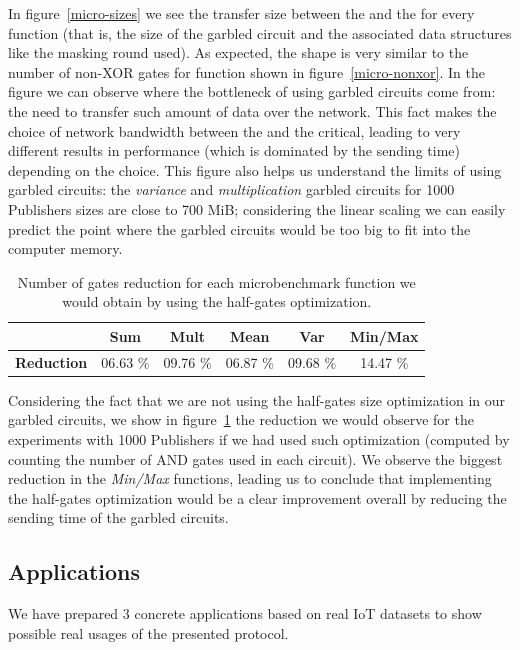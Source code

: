 In figure~\ref{micro-sizes} we see the transfer size between the \broker and
the \garbler for every function (that is, the size of the garbled circuit and
the associated data structures like the masking round used).  As expected, the
shape is very similar to the number of non-XOR gates for function shown in
figure~\ref{micro-nonxor}.  In the figure we can observe where the bottleneck
of using garbled circuits come from: the need to transfer such amount of data
over the network.  This fact makes the choice of network bandwidth between the
\broker and the \garbler critical, leading to very different results in
performance (which is dominated by the sending time) depending on the choice.
This figure also helps us understand the limits of using garbled circuits: the
\emph{variance} and \emph{multiplication} garbled circuits for 1000 Publishers
sizes are close to 700 MiB; considering the linear scaling we can easily
predict the point where the garbled circuits would be too big to fit into the
computer memory.

\begin{table}
    \begin{tabular}{l|*{4}{c}c}
      & \textbf{Sum} & \textbf{Mult} & \textbf{Mean} & \textbf{Var} & \textbf{Min/Max} \\
    \hline
    \textbf{Reduction} & 06.63 \% & 09.76 \% & 06.87 \% & 09.68 \% & 14.47 \% \\
    \end{tabular}
    \caption{Number of gates reduction for each microbenchmark function we
      would obtain by using the half-gates optimization.}
    \label{micro-and}
\end{table}

Considering the fact that we are not using the half-gates size optimization in
our garbled circuits, we show in figure~\ref{micro-and} the reduction we would
observe for the experiments with 1000 Publishers if we had used such
optimization (computed by counting the number of AND gates used in each
circuit).  We observe the biggest reduction in the \emph{Min/Max} functions,
leading us to conclude that implementing the half-gates optimization would be a
clear improvement overall by reducing the sending time of the garbled circuits.

\subsection{Applications}

We have prepared 3 concrete applications based on real IoT datasets to show
possible real usages of the presented protocol.

